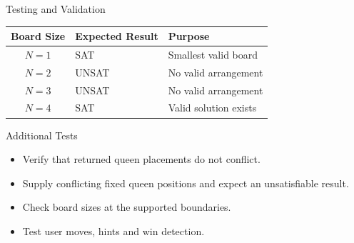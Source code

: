 \documentclass[aspectratio=169,12pt]{beamer}
\begin{document}
\begin{frame}{Testing and Validation}

\begin{table}
\centering
\small

\begin{tabular}{c l l}
\toprule
\textbf{Board Size} & \textbf{Expected Result} & \textbf{Purpose}\\
\midrule
$N=1$ & SAT & Smallest valid board\\
$N=2$ & UNSAT & No valid arrangement\\
$N=3$ & UNSAT & No valid arrangement\\
$N=4$ & SAT & Valid solution exists\\
\bottomrule
\end{tabular}

\end{table}

\vspace{0.3cm}

\begin{block}{Additional Tests}

\begin{itemize}
    \item Verify that returned queen placements do not
          conflict.
    \item Supply conflicting fixed queen positions and
          expect an unsatisfiable result.
    \item Check board sizes at the supported boundaries.
    \item Test user moves, hints and win detection.
\end{itemize}

\end{block}

\end{frame}

\end{document}
